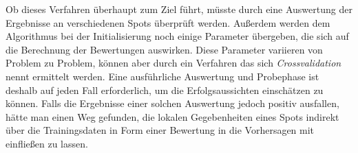 Ob dieses Verfahren überhaupt zum Ziel führt, müsste durch eine
Auswertung der Ergebnisse an verschiedenen Spots überprüft
werden. Außerdem werden dem Algorithmus bei der Initialisierung noch
einige Parameter übergeben, die sich auf die Berechnung der
Bewertungen auswirken. Diese Parameter variieren von Problem zu
Problem, können aber durch ein Verfahren das sich
\textit{Crossvalidation} nennt ermittelt werden. Eine ausführliche
Auswertung und Probephase ist deshalb auf jeden Fall erforderlich, um
die Erfolgsaussichten einschätzen zu können. Falls die Ergebnisse
einer solchen Auswertung jedoch positiv ausfallen, hätte man einen Weg
gefunden, die lokalen Gegebenheiten eines Spots indirekt über die
Trainingsdaten in Form einer Bewertung in die Vorhersagen mit
einfließen zu lassen.

